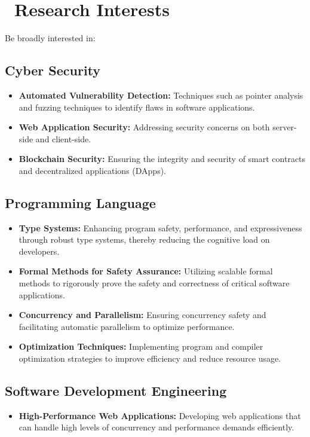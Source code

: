 \documentclass{resume}
\begin{document}
\section{\faLightbulbO\ Research Interests}
Be broadly interested in:
\subsection{Cyber Security}
\begin{itemize}
  \item \textbf{Automated Vulnerability Detection:} Techniques such as pointer analysis and fuzzing techniques to identify flaws in software applications.
  \item \textbf{Web Application Security:} Addressing security concerns on both server-side and client-side.
  \item \textbf{Blockchain Security:} Ensuring the integrity and security of smart contracts and decentralized applications (DApps).
\end{itemize}

\subsection{Programming Language}
\begin{itemize}
  \item \textbf{Type Systems:} Enhancing program safety, performance, and expressiveness through robust type systems, thereby reducing the cognitive load on developers.
  \item \textbf{Formal Methods for Safety Assurance:} Utilizing scalable formal methods to rigorously prove the safety and correctness of critical software applications.
  \item \textbf{Concurrency and Parallelism:} Ensuring concurrency safety and facilitating automatic parallelism to optimize performance.
  \item \textbf{Optimization Techniques:} Implementing program and compiler optimization strategies to improve efficiency and reduce resource usage.
\end{itemize}

\subsection{Software Development Engineering}
\begin{itemize}
  \item \textbf{High-Performance Web Applications:} Developing web applications that can handle high levels of concurrency and performance demands efficiently.
\end{itemize}
\end{document}
